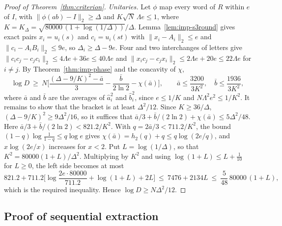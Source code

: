 \begin{proof}[Proof of Theorem~\ref{thm:criterion}]
\emph{Unitaries.} Let $\phi$ map every word of $R$ within $e$ of $I$, with $\|\phi(ab)-I\|_2\ge\Delta$ and $K\sqrt N\,\Lambda e\le1$, where
$K=K_\Delta=\sqrt{80000\,(1+\log(1/\Delta))}/\Delta$. Lemma~\ref{lem:imp-s3round} gives exact pairs $x_i=u_i(s)$ and $c_i=u_i(st)$ with
$\|x_i-A_i\|_2\le e$ and $\|c_i-A_iB_i\|_2\le9e$, so $\Delta_i\ge\Delta-9e$. Four and two interchanges of letters give
$\|c_ic_j-c_jc_i\|_2\le4\Lambda e+36e\le40\Lambda e$ and $\|x_ic_j-c_jx_i\|_2\le2\Lambda e+20e\le22\Lambda e$ for $i\ne j$. By Theorem~\ref{thm:imp-phase} and the
concavity of $\chi$,
\[
\log D\ \ge\ N\Big[\frac{(\Delta-9/K)^2-\bar a}{3}-\frac{\bar b}{2\ln2}-\chi(\bar a)\Big],\qquad \bar a\le\frac{3200}{3K^2},\quad \bar b\le\frac{1936}{3K^2},
\]
where $\bar a$ and $\bar b$ are the averages of $\hat a_i^2$ and $\hat b_i^2$, since $e\le1/K$ and $N\Lambda^2e^2\le1/K^2$. It remains to show that the
bracket is at least $\Delta^2/12$. Since $K\ge36/\Delta$, $(\Delta-9/K)^2\ge9\Delta^2/16$, so it suffices that
$\bar a/3+\bar b/(2\ln2)+\chi(\bar a)\le5\Delta^2/48$. Here $\bar a/3+\bar b/(2\ln2)<821.2/K^2$. With $q=2\bar a/3<711.2/K^2$, the bound
$(1-q)\log\frac1{1-q}\le q\log e$ gives $\chi(\bar a)=h_2(q)+q\le q\log(2e/q)$, and $x\log(2e/x)$ increases for $x<2$. Put $L=\log(1/\Delta)$, so that
$K^2=80000(1+L)/\Delta^2$. Multiplying by $K^2$ and using $\log(1+L)\le L+\frac1{10}$ for $L\ge0$, the left side becomes at most
\[
821.2+711.2\Big[\log\frac{2e\cdot80000}{711.2}+\log(1+L)+2L\Big]\ \le\ 7476+2134L\ \le\ \frac5{48}\,80000\,(1+L),
\]
which is the required inequality. Hence $\log D\ge N\Delta^2/12$.
\end{proof}

\subsection{Proof of sequential extraction}

